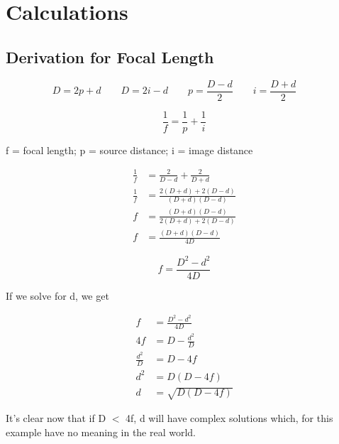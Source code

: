\documentclass{report}
\begin{document}
\chapter{Calculations}



\section{Derivation for Focal Length}

\label{question1}
$$
    D=2p+d          \hspace{2em}
    D=2i-d         \hspace{2em}
    p=\frac{D-d}{2} \hspace{2em}
    i=\frac{D+d}{2} \hspace{2em}
$$

\begin{equation}
    \frac{1}{f} =\frac{1}{p}+\frac{1}{i}
    \label{thinLensFormula}
\end{equation}

{\scriptsize f = focal length; p = source distance; i = image distance}

$$
    \begin{aligned}
        \frac{1}{f} & =\frac{2}{D-d}+\frac{2}{D+d}      \\
        \frac{1}{f} & =\frac{2(D+d)+2(D-d)}{(D+d)(D-d)} \\
        f           & =\frac{(D+d)(D-d)}{2(D+d)+2(D-d)} \\
        f           & =\frac{(D+d)(D-d)}{4 D}
    \end{aligned}
$$

\begin{equation}
    f =\frac{D^{2}-d^{2}}{4 D}
    \label{focalLength}
\end{equation}

If we solve for d, we get

$$
    \begin{aligned}
        f               & =\frac{D^{2}-d^{2}}{4 D} \\
        4 f             & =D-\frac{d^{2}}{D}       \\
        \frac{d^{2}}{D} & =D-4 f                   \\
        d^{2}           & =D(D-4 f)                \\
        d               & =\sqrt{D(D-4 f)}
    \end{aligned}
$$

It's clear now that if D $<$ 4f, d will have complex solutions which, for this example have no meaning in the real world.
\end{document}
